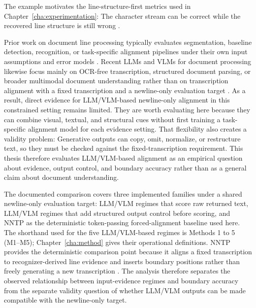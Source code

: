 The example motivates the line-structure-first metrics used in Chapter~\ref{cha:experimentation}: The character stream can be correct while the recovered line structure is still wrong .

Prior work on document line processing typically evaluates segmentation, baseline detection, recognition, or task-specific alignment pipelines under their own input assumptions and error models . Recent LLMs and VLMs for document processing likewise focus mainly on OCR-free transcription, structured document parsing, or broader multimodal document understanding rather than on transcription alignment with a fixed transcription and a newline-only evaluation target . As a result, direct evidence for LLM/VLM-based newline-only alignment in this constrained setting remains limited. They are worth evaluating here because they can combine visual, textual, and structural cues without first training a task-specific alignment model for each evidence setting. That flexibility also creates a validity problem: Generative outputs can copy, omit, normalize, or restructure text, so they must be checked against the fixed-transcription requirement. This thesis therefore evaluates LLM/VLM-based alignment as an empirical question about evidence, output control, and boundary accuracy rather than as a general claim about document understanding.

The documented comparison covers three implemented families under a shared newline-only evaluation target: LLM/VLM regimes that score raw returned text, LLM/VLM regimes that add structured output control before scoring, and NNTP as the deterministic token-passing forced-alignment baseline used here. The shorthand used for the five LLM/VLM-based regimes is Methods 1 to 5 (M1--M5); Chapter~\ref{cha:method} gives their operational definitions. NNTP provides the deterministic comparison point because it aligns a fixed transcription to recognizer-derived line evidence and inserts boundary positions rather than freely generating a new transcription . The analysis therefore separates the observed relationship between input-evidence regimes and boundary accuracy from the separate validity question of whether LLM/VLM outputs can be made compatible with the newline-only target.

